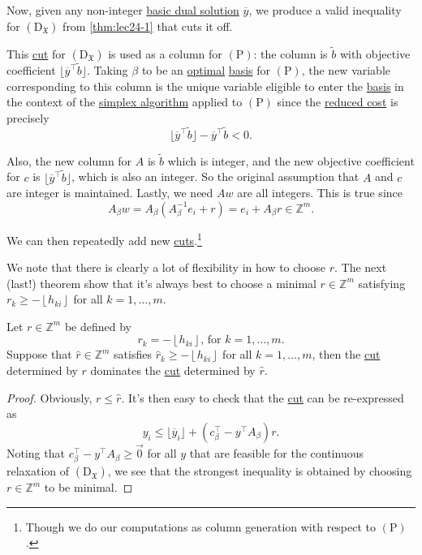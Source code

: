 Now, given any non-integer \hyperref[def:dual-basic-solution]{basic dual solution} \(\overline{y}\), we produce a valid inequality for \((\mathrm{D}_{\mathfrak{X}})\) from \autoref{thm:lec24-1} that cuts it off.
\begin{note}
	This \hyperref[def:Chvatal-Gomory-cut]{cut} for \((\mathrm{D}_{\mathfrak{X}})\) is used as a column for \((\mathrm{P})\): the column is \(\widetilde{b} \) with objective coefficient \(\lfloor \overline{y} ^{\top} \widetilde{b} \rfloor\). Taking \(\beta\) to be an \hyperref[def:optimal-solution]{optimal} \hyperref[def:basis]{basis} for \((\mathrm{P})\), the new variable corresponding to this column is the unique variable eligible to enter the \hyperref[def:basis]{basis} in the context of the \hyperref[algo:simplex-algorithm]{simplex algorithm} applied to \((\mathrm{P})\) since the \hyperref[def:reduced-cost]{reduced cost} is precisely
	\[
		\lfloor \overline{y} ^{\top} \widetilde{b} \rfloor-\overline{y} ^{\top} \widetilde{b} < 0.
	\]

	Also, the new column for \(A\) is \(\widetilde{b} \) which is integer, and the new objective coefficient for \(c\) is \(\lfloor \overline{y} ^{\top} \widetilde{b} \rfloor\), which is also an integer. So the original assumption that \(A\) and \(c\) are integer is maintained. Lastly, we need \(Aw\) are all integers. This is true since
	\[
		A_{\beta}w = A_{\beta}\left(A^{-1}_{\beta}e_{i}+r\right) = e_{i}+A_{\beta}r \in \mathbb{Z}^m.
	\]

	We can then repeatedly add new \hyperref[def:Chvatal-Gomory-cut]{cuts}.\footnote{Though we do our computations as column generation with respect to \((\mathrm{P})\).}
\end{note}

We note that there is clearly a lot of flexibility in how to choose \(r\). The next (last!) theorem show that it's always best to choose a minimal \(r\in \mathbb{Z} ^m\)  satisfying \(r_k \geq -\left\lfloor h_{ki} \right\rfloor\) for all \(k = 1, \ldots  , m\).

\begin{theorem}\label{thm:lec24-3}
	Let \(r\in \mathbb{Z} ^m\) be defined by
	\[
		r_k = -\left\lfloor h_{ki} \right\rfloor\text{, for }k = 1, \ldots , m.
	\]
	Suppose that \(\hat{r} \in \mathbb{Z} ^m\) satisfies \(\hat{r}_k \geq -\left\lfloor h_{ki} \right\rfloor\) for all \(k = 1, \ldots , m\), then the \hyperref[def:Chvatal-Gomory-cut]{cut} determined by \(r\) dominates the \hyperref[def:Chvatal-Gomory-cut]{cut} determined by \(\hat{r} \).
\end{theorem}
\begin{proof}
	Obviously, \(r \leq \hat{r} \). It's then easy to check that the \hyperref[def:Chvatal-Gomory-cut]{cut} can be re-expressed as
	\[
		y_{i} \leq \lfloor \overline{y} _{i} \rfloor + (c^{\top} _\beta - y^{\top} A_\beta )r.
	\]
	Noting that \(c^{\top} _\beta - y^{\top} A_\beta \geq \vec{0} \) for all \(y\) that are feasible for the continuous relaxation of \((\mathrm{D}_{\mathfrak{X}})\), we see that the strongest inequality is obtained by choosing \(r\in\mathbb{Z} ^m\) to be minimal.
\end{proof}

